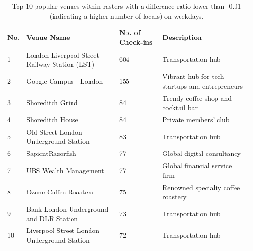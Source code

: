 \documentclass{article}
\theoremstyle{definition}
\theoremstyle{remark}
\begin{document}
\begin{table}[!h]
\centering
\caption{\label{tab:popular_venues_localspop_weekday}Top 10 popular venues within rasters with a difference ratio lower than -0.01 (indicating a higher number of locals) on weekdays.}
\begin{adjustbox}{max width=\textwidth, margin=0cm}
\begin{threeparttable}
\begin{tabular}{lp{5cm}lp{4cm}} \hline
No. & Venue Name & No. of Check-ins & Description \\ \hline
1 & London Liverpool Street Railway Station (LST) & 604 & Transportation hub \\
2 & Google Campus - London & 155 & Vibrant hub for tech startups and entrepreneurs \\
3 & Shoreditch Grind & 84 & Trendy coffee shop and cocktail bar \\
4 & Shoreditch House & 84 & Private members' club \\
5 & Old Street London Underground Station & 83 & Transportation hub \\
6 & SapientRazorfish & 77 & Global digital consultancy \\
7 & UBS Wealth Management & 77 & Global financial service firm \\
8 & Ozone Coffee Roasters & 75 & Renowned specialty coffee roastery \\
9 & Bank London Underground and DLR Station & 73 & Transportation hub \\
10 & Liverpool Street London Underground Station & 72 & Transportation hub \\ \hline
\end{tabular}
\end{threeparttable}
\end{adjustbox}
\end{table}
\end{document}
